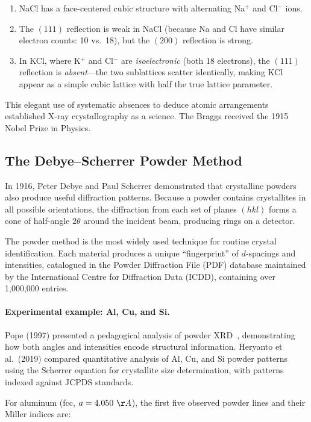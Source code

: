 \begin{enumerate}[nosep]
  \item NaCl has a face-centered cubic structure with alternating Na$^+$ and Cl$^-$ ions.
  \item The $(111)$ reflection is weak in NaCl (because Na and Cl have similar electron counts: 10 vs.\ 18), but the $(200)$ reflection is strong.
  \item In KCl, where K$^+$ and Cl$^-$ are \textit{isoelectronic} (both 18 electrons), the $(111)$ reflection is \textit{absent}---the two sublattices scatter identically, making KCl appear as a simple cubic lattice with half the true lattice parameter.
\end{enumerate}

This elegant use of systematic absences to deduce atomic arrangements established X-ray crystallography as a science. The Braggs received the 1915 Nobel Prize in Physics.

\subsection{The Debye--Scherrer Powder Method}

In 1916, Peter Debye and Paul Scherrer demonstrated that crystalline powders also produce useful diffraction patterns. Because a powder contains crystallites in all possible orientations, the diffraction from each set of planes $(hkl)$ forms a cone of half-angle $2\theta$ around the incident beam, producing rings on a detector.

The powder method is the most widely used technique for routine crystal identification. Each material produces a unique ``fingerprint'' of $d$-spacings and intensities, catalogued in the Powder Diffraction File (PDF) database maintained by the International Centre for Diffraction Data (ICDD), containing over 1,000,000 entries.

\paragraph{Experimental example: Al, Cu, and Si.} Pope (1997) presented a pedagogical analysis of powder XRD~\cite{bragg1913structure}, demonstrating how both angles and intensities encode structural information. Heryanto et al.\ (2019) compared quantitative analysis of Al, Cu, and Si powder patterns using the Scherrer equation for crystallite size determination, with patterns indexed against JCPDS standards.

For aluminum (fcc, $a = 4.050~\AA{}$), the first five observed powder lines and their Miller indices are:


